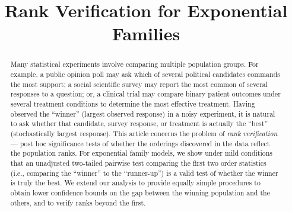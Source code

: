 \documentclass[aos, authoryear]{imsart}
\theoremstyle{definition}
\theoremstyle{custom}
\begin{document}
\begin{frontmatter}

\title{Rank Verification for Exponential Families}


\begin{abstract}
Many statistical experiments involve comparing multiple population groups. For example, a public opinion poll may ask which of several political candidates commands the most support; a social scientific survey may report the most common of several responses to a question; or, a clinical trial may compare binary patient outcomes under several treatment conditions to determine the most effective treatment. Having observed the ``winner'' (largest observed response) in a noisy experiment, it is natural to ask whether that candidate, survey response, or treatment is actually the ``best'' (stochastically largest response). This article concerns the problem of {\em rank verification} --- post hoc significance tests of whether the orderings discovered in the data reflect the population ranks. For exponential family models, we show under mild conditions that an unadjusted two-tailed pairwise test comparing the first two order statistics (i.e., comparing the ``winner'' to the ``runner-up'') is a valid test of whether the winner is truly the best. We extend our analysis to provide equally simple procedures to obtain lower confidence bounds on the gap between the winning population and the others, and to verify ranks beyond the first.
\end{abstract}

\begin{keyword}[class=MSC]
\end{keyword}

\begin{keyword}
\end{keyword}

\end{frontmatter}
\end{document}
